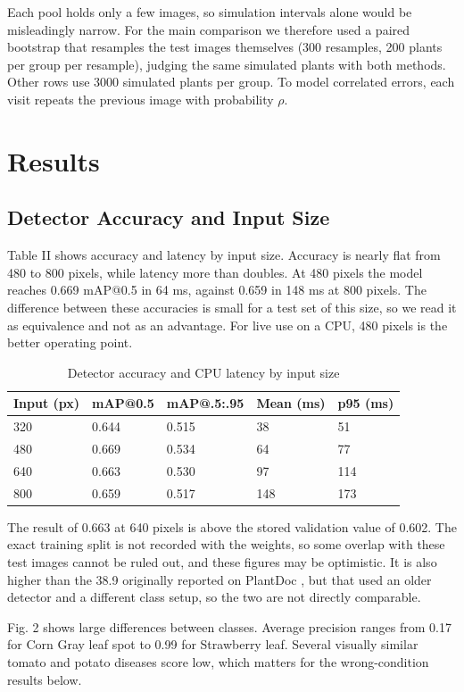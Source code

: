 \documentclass[conference]{IEEEtran}
\begin{document}
Each pool holds only a few images, so simulation intervals alone would be misleadingly narrow. For the main comparison we therefore used a paired bootstrap that resamples the test images themselves (300 resamples, 200 plants per group per resample), judging the same simulated plants with both methods. Other rows use 3000 simulated plants per group. To model correlated errors, each visit repeats the previous image with probability $\rho$.

\section{Results}
\subsection{Detector Accuracy and Input Size}
Table II shows accuracy and latency by input size. Accuracy is nearly flat from 480 to 800 pixels, while latency more than doubles. At 480 pixels the model reaches 0.669 mAP@0.5 in 64 ms, against 0.659 in 148 ms at 800 pixels. The difference between these accuracies is small for a test set of this size, so we read it as equivalence and not as an advantage. For live use on a CPU, 480 pixels is the better operating point.

\begin{table}[t]
\centering
\caption{Detector accuracy and CPU latency by input size}
\footnotesize
\begin{tabular}{lllll}
\toprule
Input (px) & mAP@0.5 & mAP@.5:.95 & Mean (ms) & p95 (ms) \\
\midrule
320 & 0.644 & 0.515 & 38 & 51 \\
480 & 0.669 & 0.534 & 64 & 77 \\
640 & 0.663 & 0.530 & 97 & 114 \\
800 & 0.659 & 0.517 & 148 & 173 \\
\bottomrule
\end{tabular}
\end{table}
The result of 0.663 at 640 pixels is above the stored validation value of 0.602. The exact training split is not recorded with the weights, so some overlap with these test images cannot be ruled out, and these figures may be optimistic. It is also higher than the 38.9 originally reported on PlantDoc \cite{plantdoc}, but that used an older detector and a different class setup, so the two are not directly comparable.

Fig. 2 shows large differences between classes. Average precision ranges from 0.17 for Corn Gray leaf spot to 0.99 for Strawberry leaf. Several visually similar tomato and potato diseases score low, which matters for the wrong-condition results below.
\end{document}

